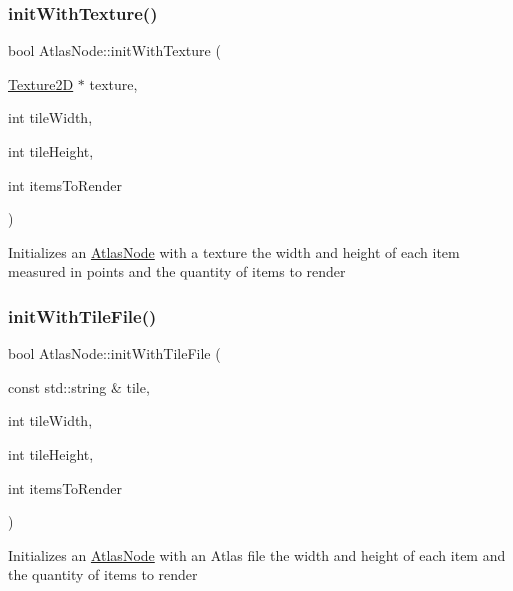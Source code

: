 \subsubsection{\texorpdfstring{init\+With\+Texture()}{initWithTexture()}\hspace{0.1cm}{\footnotesize\ttfamily [2/2]}}
{\footnotesize\ttfamily bool Atlas\+Node\+::init\+With\+Texture (\begin{DoxyParamCaption}\item[{\hyperlink{classTexture2D}{Texture2D} $\ast$}]{texture,  }\item[{int}]{tile\+Width,  }\item[{int}]{tile\+Height,  }\item[{int}]{items\+To\+Render }\end{DoxyParamCaption})}

Initializes an \hyperlink{classAtlasNode}{Atlas\+Node} with a texture the width and height of each item measured in points and the quantity of items to render \mbox{\label{classAtlasNode_a70804bf430d042bb94a6e2b18c47d7f2}} 
\subsubsection{\texorpdfstring{init\+With\+Tile\+File()}{initWithTileFile()}\hspace{0.1cm}{\footnotesize\ttfamily [1/2]}}
{\footnotesize\ttfamily bool Atlas\+Node\+::init\+With\+Tile\+File (\begin{DoxyParamCaption}\item[{const std\+::string \&}]{tile,  }\item[{int}]{tile\+Width,  }\item[{int}]{tile\+Height,  }\item[{int}]{items\+To\+Render }\end{DoxyParamCaption})}

Initializes an \hyperlink{classAtlasNode}{Atlas\+Node} with an Atlas file the width and height of each item and the quantity of items to render \mbox{\label{classAtlasNode_a70804bf430d042bb94a6e2b18c47d7f2}} 
